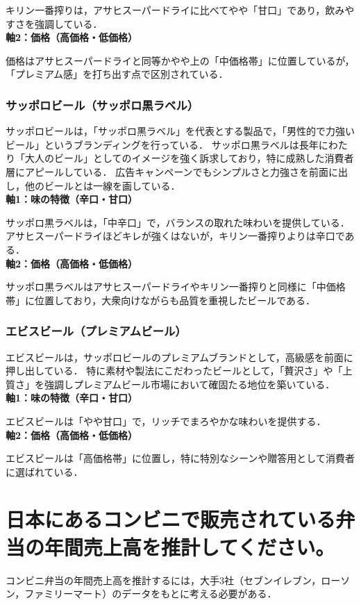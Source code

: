 \documentclass[titlepage,a4paper]{jsarticle}
\begin{document}
キリン一番搾りは，アサヒスーパードライに比べてやや「甘口」であり，飲みやすさを強調している．
\\\textbf{軸2：価格（高価格・低価格）}

価格はアサヒスーパードライと同等かやや上の「中価格帯」に位置しているが，「プレミアム感」を打ち出す点で区別されている．

\subsubsection{サッポロビール（サッポロ黒ラベル）}
サッポロビールは，「サッポロ黒ラベル」を代表とする製品で，「男性的で力強いビール」というブランディングを行っている．
サッポロ黒ラベルは長年にわたり「大人のビール」としてのイメージを強く訴求しており，特に成熟した消費者層にアピールしている．
広告キャンペーンでもシンプルさと力強さを前面に出し，他のビールとは一線を画している．
\\\textbf{軸1：味の特徴（辛口・甘口）}

サッポロ黒ラベルは，「中辛口」で，バランスの取れた味わいを提供している．
アサヒスーパードライほどキレが強くはないが，キリン一番搾りよりは辛口である．
\\\textbf{軸2：価格（高価格・低価格）}

サッポロ黒ラベルはアサヒスーパードライやキリン一番搾りと同様に「中価格帯」に位置しており，大衆向けながらも品質を重視したビールである．

\subsubsection{エビスビール（プレミアムビール）}
エビスビールは，サッポロビールのプレミアムブランドとして，高級感を前面に押し出している．
特に素材や製法にこだわったビールとして，「贅沢さ」や「上質さ」を強調しプレミアムビール市場において確固たる地位を築いている．
\\\textbf{軸1：味の特徴（辛口・甘口）}

エビスビールは「やや甘口」で，リッチでまろやかな味わいを提供する．
\\\textbf{軸2：価格（高価格・低価格）}

エビスビールは「高価格帯」に位置し，特に特別なシーンや贈答用として消費者に選ばれている．

\section{日本にあるコンビニで販売されている弁当の年間売上高を推計してください。}
コンビニ弁当の年間売上高を推計するには，大手3社（セブンイレブン，ローソン，ファミリーマート）のデータをもとに考える必要がある．
\end{document}
